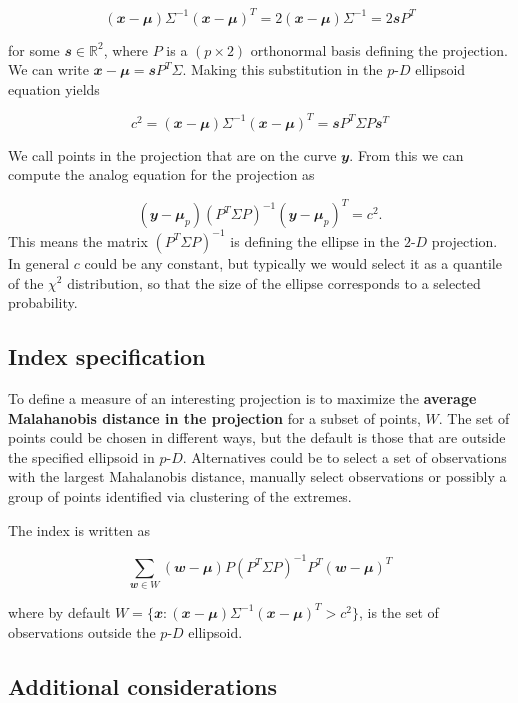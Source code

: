 \documentclass[
  12pt]{article}
\newcommand\pD{$p\text{-}D$}
\newcommand\gD{$2\text{-}D$}
\begin{document}
\[(\mathbfit{x}-\mathbfit{\mu}) \Sigma^{-1}(\mathbfit{x}-\mathbfit{\mu})^T = 2 (\mathbfit{x}-\mathbfit{\mu}) \Sigma^{-1} = 2\mathbfit{s}P^T
\]

for some \(\mathbfit{s} \in \mathbb{R}^2\), where \(P\) is a
\((p\times 2)\) orthonormal basis defining the projection. We can write
\(\mathbfit{x}-\mathbfit{\mu} = \mathbfit{s} P^T \Sigma\). Making this
substitution in the \pD{} ellipsoid equation yields

\[c^2 = (\mathbfit{x}-\mathbfit{\mu}) \Sigma^{-1}(\mathbfit{x}-\mathbfit{\mu})^T = \mathbfit{s} P^T \Sigma P \mathbfit{s}^T
\]

We call points in the projection that are on the curve \(\mathbfit{y}\).
From this we can compute the analog equation for the projection as

\[(\mathbfit{y} - \mathbfit{\mu}_p)(P^T \Sigma P)^{-1}(\mathbfit{y} - \mathbfit{\mu}_p)^T = c^2.\]
This means the matrix \((P^T \Sigma P)^{-1}\) is defining the ellipse in
the \gD{} projection. In general \(c\) could be any constant, but
typically we would select it as a quantile of the \(\chi^2\)
distribution, so that the size of the ellipse corresponds to a selected
probability.

\subsection{Index specification}\label{index-specification}

To define a measure of an interesting projection is to maximize the
\textbf{average Malahanobis distance in the projection} for a subset of
points, \(W\). The set of points could be chosen in different ways, but
the default is those that are outside the specified ellipsoid in \pD{}.
Alternatives could be to select a set of observations with the largest
Mahalanobis distance, manually select observations or possibly a group
of points identified via clustering of the extremes.

The index is written as

\[
\sum_{\mathbfit{w} \in W} (\mathbfit{w} - \mathbfit{\mu}) P (P^T\Sigma P)^{-1}P^T(\mathbfit{w} - \mathbfit{\mu})^T
\]

where by default
\(W = \{\mathbfit{x}: (\mathbfit{x}-\mathbfit{\mu}) \Sigma^{-1}(\mathbfit{x}-\mathbfit{\mu})^T > c^2\}\),
is the set of observations outside the \pD{} ellipsoid.

\subsection{Additional considerations}\label{additional-considerations}
\end{document}
